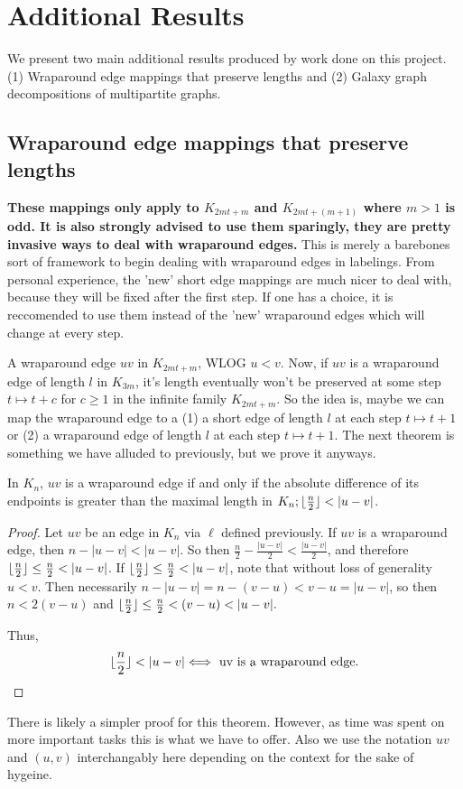 \chapter{Additional Results} \label{chap:Additional Results}

We present two main additional results produced by work done on this project. (1) Wraparound edge mappings that preserve lengths and (2) Galaxy graph decompositions of multipartite graphs.

\section{Wraparound edge mappings that preserve lengths}

\textbf{These mappings only apply to $K_{2mt+m}$ and $K_{2mt+(m+1)}$ where $m>1$ is odd. It is also strongly advised to use them sparingly, they are pretty invasive ways to deal with wraparound edges.} This is merely a barebones sort of framework to begin dealing with wraparound edges in labelings. From personal experience, the 'new' short edge mappings are much nicer to deal with, because they will be fixed after the first step. If one has a choice, it is reccomended to use them instead of the 'new' wraparound edges which will change at every step.

A wraparound edge $uv$ in $K_{2mt+m}$, WLOG $u<v$. Now, if $uv$ is a wraparound edge of length $l$ in $K_{3m}$, it's length eventually won't be preserved at some step $t\mapsto t+c$ for $c\geq 1$ in the infinite family $K_{2mt+m}$. So the idea is, maybe we can map the wraparound edge to a (1) a short edge of length $l$ at each step $t\mapsto t+1$ or (2) a wraparound edge of length $l$ at each step $t\mapsto t+1$. The next theorem is something we have alluded to previously, but we prove it anyways.\newpage
\begin{thm} \label{thm:wraplarger}
    In $K_{n}$, $uv$ is a wraparound edge if and only if the absolute difference of its endpoints is greater than the maximal length in $K_{n};\floor{\frac{n}{2}}<|u-v|$. 
    \begin{proof}
        Let $uv$ be an edge in $K_{n}$ via $\ell$ defined previously. If $uv$ is a wraparound edge, then $n-|u-v|<|u-v|$. So then $\frac{n}{2}-\frac{|u-v|}{2}<\frac{|u-v|}{2}$, and therefore $\floor{\frac{n}{2}}\leq \frac{n}{2}<|u-v|$. If $\floor{\frac{n}{2}}\leq \frac{n}{2}<|u-v|$, note that without loss of generality $u<v$. Then necessarily $n-|u-v|=n-(v-u)<v-u=|u-v|$, so then $n<2(v-u)$ and $\floor{\frac{n}{2}}\leq\frac{n}{2}<(v-u)<|u-v|.$
    
        Thus,
        $$\floor{\frac{n}{2}}<|u-v|\Longleftrightarrow\text{ uv is a wraparound edge.}$$
    \end{proof}
    \end{thm}
There is likely a simpler proof for this theorem. However, as time was spent on more important tasks this is what we have to offer. Also we use the notation $uv$ and $(u,v)$ interchangably here depending on the context for the sake of hygeine.

